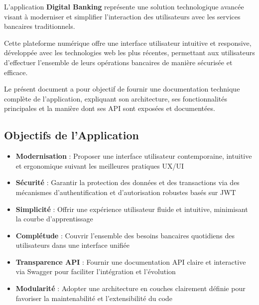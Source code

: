 \documentclass[10pt]{article}
\begin{document}
\begin{secondarybox}[title=Présentation générale]
\sffamily\justify
L'application \textbf{Digital Banking} représente une solution technologique avancée visant à moderniser et simplifier l'interaction des utilisateurs avec les services bancaires traditionnels.

Cette plateforme numérique offre une interface utilisateur intuitive et responsive, développée avec les technologies web les plus récentes, permettant aux utilisateurs d'effectuer l'ensemble de leurs opérations bancaires de manière sécurisée et efficace.

Le présent document a pour objectif de fournir une documentation technique complète de l'application, expliquant son architecture, ses fonctionnalités principales et la manière dont ses API sont exposées et documentées.
\end{secondarybox}

\subsection{Objectifs de l'Application}


\begin{itemize}[leftmargin=20pt, itemsep=5pt]
    \item \textbf{\textcolor{primary}{Modernisation}} : Proposer une interface utilisateur contemporaine, intuitive et ergonomique suivant les meilleures pratiques UX/UI
    
    \item \textbf{\textcolor{primary}{Sécurité}} : Garantir la protection des données et des transactions via des mécanismes d'authentification et d'autorisation robustes basés sur JWT
    
    \item \textbf{\textcolor{primary}{Simplicité}} : Offrir une expérience utilisateur fluide et intuitive, minimisant la courbe d'apprentissage
    
    \item \textbf{\textcolor{primary}{Complétude}} : Couvrir l'ensemble des besoins bancaires quotidiens des utilisateurs dans une interface unifiée
    
    \item \textbf{\textcolor{primary}{Transparence API}} : Fournir une documentation API claire et interactive via Swagger pour faciliter l'intégration et l'évolution
    
    \item \textbf{\textcolor{primary}{Modularité}} : Adopter une architecture en couches clairement définie pour favoriser la maintenabilité et l'extensibilité du code
\end{itemize}
\end{document}
